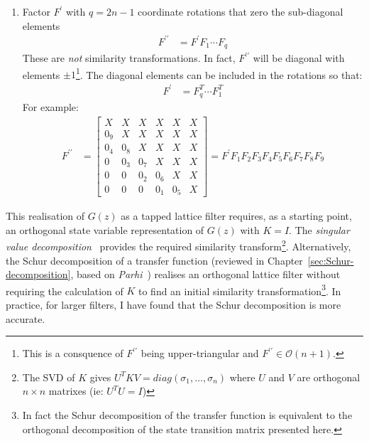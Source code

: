 \documentclass[a4paper,twoside,10pt,english]{report}
\begin{document}
\begin{enumerate}
\begin{align*}
\begin{array}{cccccc}
X & X & X & X & X & X\\
X & X & X & X & X & X\\
X & X & X & X & X & X\\
F_{4,1}^{\prime} & X & X & X & X & X\\
F_{5,1}^{\prime} & F_{5,2}^{\prime} & X & X & X & X\\
0 & F_{6,2}^{\prime} & F_{6,3}^{\prime} & X & X & X
\end{array}\right]
\end{align*}
\item Factor $F^{\prime}$ with $q=2n-1$ coordinate rotations that zero the
sub-diagonal elements 
\begin{align*}
F^{\prime\prime} &= F^{\prime}F_{1}\cdots F_{q}
\end{align*}
These are \emph{not} similarity transformations. In fact, $F^{\prime\prime}$
will be diagonal with elements $\pm 1$\footnote{This is a consquence of 
$F^{\prime\prime}$ being upper-triangular and
$F^{\prime\prime} \in \mathcal{O}\left(n+1\right)$.}. The diagonal elements
 can be included in the rotations so that:
\begin{align*}
F^{\prime} &= F_{q}^{T}\cdots F_{1}^{T}
\end{align*}
For example:
\begin{align*}
F^{\prime\prime} &= \left[\begin{array}{cccccc}
X & X & X & X & X & X\\
0_{9} & X & X & X & X & X\\
0_{4} & 0_{8} & X & X & X & X\\
0 & 0_{3} & 0_{7} & X & X & X\\
0 & 0 & 0_{2} & 0_{6} & X & X\\
0 & 0 & 0 & 0_{1} & 0_{5} & X
\end{array}\right]=F^{\prime}F_{1}F_{2}F_{3}F_{4}F_{5}F_{6}F_{7}F_{8}F_{9}
\end{align*}
\end{enumerate}

This realisation of $G\left(z\right)$ as
a tapped lattice filter requires, as a starting point, an orthogonal state 
variable representation of $G\left(z\right)$ with $K=I$. The \emph{singular
value decomposition}~\cite[Theorem 2.5.2]{GolubVanLoan_MatrixComputations} 
provides the required similarity transform\footnote{The SVD of $K$ gives
$U^{T}KV=diag\left(\sigma_{1},\ldots,\sigma_{n}\right)$ where $U$ and $V$
are orthogonal $n\times{}n$ matrixes (ie: $U^{T}U=I$)}. Alternatively, 
the Schur decomposition of a transfer function (reviewed in
Chapter~\ref{sec:Schur-decomposition}, based on 
\emph{Parhi}~\cite[Chapter 12]{Parhi_VLSIDigitalSignalProcessingSystems}) 
realises an orthogonal lattice filter without requiring the calculation of $K$ 
to find an initial similarity transformation\footnote{In fact the Schur 
decomposition of the transfer function is equivalent to the orthogonal 
decomposition of the state transition matrix presented here.}. In practice, for 
larger filters, I have found that the Schur decomposition is more accurate. 
\end{document}
